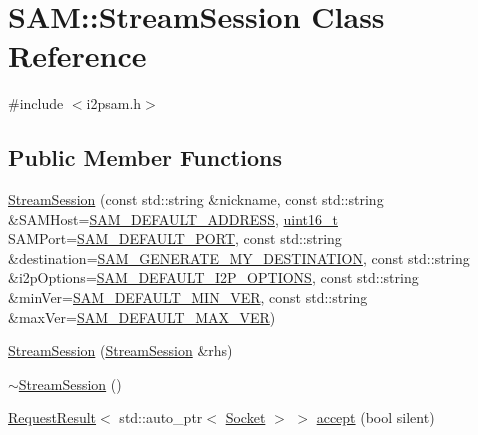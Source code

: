 \hypertarget{class_s_a_m_1_1_stream_session}{}\section{S\+A\+M\+:\+:Stream\+Session Class Reference}
\label{class_s_a_m_1_1_stream_session}


{\ttfamily \#include $<$i2psam.\+h$>$}

\subsection*{Public Member Functions}
\begin{DoxyCompactItemize}
\item 
\hyperlink{class_s_a_m_1_1_stream_session_a8c0e662f65ac3b0bf9da6dac1f051400}{Stream\+Session} (const std\+::string \&nickname, const std\+::string \&S\+A\+M\+Host=\hyperlink{i2psam_8h_a0a23b2412e2cddafabcca92a35671854}{S\+A\+M\+\_\+\+D\+E\+F\+A\+U\+L\+T\+\_\+\+A\+D\+D\+R\+E\+S\+S}, \hyperlink{stdint_8h_a273cf69d639a59973b6019625df33e30}{uint16\+\_\+t} S\+A\+M\+Port=\hyperlink{i2psam_8h_a21f3ab7f14d3db851db9d30698abbc15}{S\+A\+M\+\_\+\+D\+E\+F\+A\+U\+L\+T\+\_\+\+P\+O\+R\+T}, const std\+::string \&destination=\hyperlink{i2psam_8h_a7106d11b70e8d692b4f3ee6cbac5d1f1}{S\+A\+M\+\_\+\+G\+E\+N\+E\+R\+A\+T\+E\+\_\+\+M\+Y\+\_\+\+D\+E\+S\+T\+I\+N\+A\+T\+I\+O\+N}, const std\+::string \&i2p\+Options=\hyperlink{i2psam_8h_a27b1654d5365d0ef151d0a185b4aea36}{S\+A\+M\+\_\+\+D\+E\+F\+A\+U\+L\+T\+\_\+\+I2\+P\+\_\+\+O\+P\+T\+I\+O\+N\+S}, const std\+::string \&min\+Ver=\hyperlink{i2psam_8h_a6d69841635f067c7d798c07286cc09f0}{S\+A\+M\+\_\+\+D\+E\+F\+A\+U\+L\+T\+\_\+\+M\+I\+N\+\_\+\+V\+E\+R}, const std\+::string \&max\+Ver=\hyperlink{i2psam_8h_a37975b7aa109cc3353552fa5e69236d0}{S\+A\+M\+\_\+\+D\+E\+F\+A\+U\+L\+T\+\_\+\+M\+A\+X\+\_\+\+V\+E\+R})
\item 
\hyperlink{class_s_a_m_1_1_stream_session_acf0524038cc788a6d4833beb23090e53}{Stream\+Session} (\hyperlink{class_s_a_m_1_1_stream_session}{Stream\+Session} \&rhs)
\item 
\hyperlink{class_s_a_m_1_1_stream_session_a651f8f24fca3be7aa942ca705e54d377}{$\sim$\+Stream\+Session} ()
\item 
\hyperlink{struct_s_a_m_1_1_request_result}{Request\+Result}$<$ std\+::auto\+\_\+ptr$<$ \hyperlink{class_s_a_m_1_1_socket}{Socket} $>$ $>$ \hyperlink{class_s_a_m_1_1_stream_session_a438d8c25762f240775717f7952110351}{accept} (bool silent)
\item 

\end{DoxyCompactItemize}
